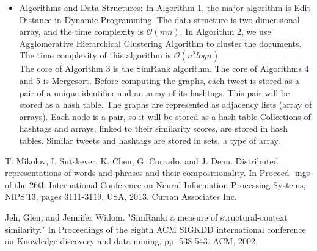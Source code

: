 \documentclass[10pt]{article}
\begin{document}
\begin{itemize}
\item{Algorithms and  Data Structures:}
In Algorithm 1, the major algorithm is Edit Distance in Dynamic Programming. The data structure is two-dimensional array, and the time complexity is $ \mathcal{O}(mn)$. In Algorithm 2, we use Agglomerative Hierarchical Clustering Algorithm to cluster the documents. The time complexity of this algorithm is $ \mathcal{O}(n^2logn)$ \\

The core of Algorithm 3 is the SimRank algorithm. The core of Algorithms 4 and 5 is Mergesort. Before computing the graphs, each tweet is stored as a pair of a unique identifier and an array of its hashtags. This pair will be stored as a hash table. The graphs are represented as adjacency lists (array of arrays). Each node is a pair, so it will be stored as a hash table Collections of hashtags and arrays, linked to their similarity scores, are stored in hash tables. Similar tweets and hashtags are stored in sets, a type of array. 
\end{itemize}

\iffalse
\begin{itemize} 
\item{  Flow Diagram Major Constraints.}
Please insert here the integrity constraints:
\begin{itemize} 
\item{ Integrity Constraint. }
Please insert the first integrity constraint in here together with its description and justification. 
\end{itemize}
Please repeat the pattern for each integrity constraint.
\end{itemize}
\fi



%

\begin{thebibliography}{2}
{}
T. Mikolov, I. Sutskever, K. Chen, G. Corrado, and J. Dean. Distributed
representations of words and phrases and their compositionality. In Proceed-
ings of the 26th International Conference on Neural Information Processing
Systems, NIPS'13, pages 3111-3119, USA, 2013. Curran Associates Inc.
	
Jeh, Glen, and Jennifer Widom. "SimRank: a measure of structural-context similarity." In Proceedings of the eighth ACM SIGKDD international conference on Knowledge discovery and data mining, pp. 538-543. ACM, 2002.

\end{thebibliography}
\end{document}
